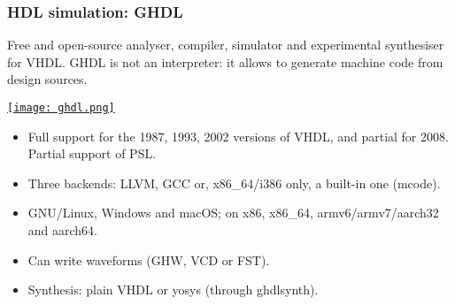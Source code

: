 \documentclass{beamer}
\begin{document}
\begin{frame}
\frametitle{HDL simulation: GHDL}
\small Free and open-source  analyser, compiler, simulator and experimental synthesiser for VHDL. GHDL is not an interpreter: it allows to generate machine code from design sources.

\vfill
\href{https://ghdl.github.io/ghdl/}{\texttt{[image: ghdl.png]}}
\vfill

\tiny
\begin{itemize}
  \item Full support for the 1987, 1993, 2002 versions of VHDL, and partial for 2008. Partial support of PSL.
  \item Three backends: LLVM, GCC or, x86\_64/i386 only, a built-in one (mcode).
  \item GNU/Linux, Windows and macOS; on x86, x86\_64, armv6/armv7/aarch32 and aarch64.
  \item Can write waveforms (GHW, VCD or FST).
  \item Synthesis: plain VHDL or yosys (through ghdlsynth).
\end{itemize}
\end{frame}

\end{document}
